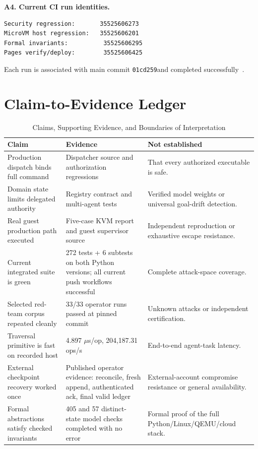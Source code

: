 \documentclass[journal]{IEEEtran}
\newcommand{\mainshort}{\texttt{01cd259}}
\begin{document}
\textbf{A4. Current CI run identities.}
\begin{verbatim}
Security regression:       35525606273
MicroVM host regression:   35525606201
Formal invariants:          35525606295
Pages verify/deploy:        35525606425
\end{verbatim}
Each run is associated with main commit \mainshort and completed successfully~\cite{BULL_CI_Security,BULL_CI_MicroVM,BULL_CI_Formal,BULL_CI_Pages}.

\section{Claim-to-Evidence Ledger}
\begin{table}[!t]
\caption{Claims, Supporting Evidence, and Boundaries of Interpretation}
\label{tab:ledger}
\centering
\small
\begin{tabularx}{\textwidth}{lYY}
\toprule
\textbf{Claim} & \textbf{Evidence} & \textbf{Not established} \\
\midrule
Production dispatch binds full command & Dispatcher source and authorization regressions~\cite{BULL_Dispatcher,BULL_CI_Security} & That every authorized executable is safe. \\
Domain state limits delegated authority & Registry contract and multi-agent tests~\cite{BULL_SecurityDomain,BULL_MultiAgent} & Verified model weights or universal goal-drift detection. \\
Real guest production path executed & Five-case KVM report and guest supervisor source~\cite{BULL_MicroVMReport,BULL_GuestEngine} & Independent reproduction or exhaustive escape resistance. \\
Current integrated suite is green & 272 tests + 6 subtests on both Python versions; all current push workflows successful~\cite{BULL_CI_Security,BULL_CI_MicroVM,BULL_CI_Formal,BULL_CI_Pages} & Complete attack-space coverage. \\
Selected red-team corpus repeated cleanly & 33/33 operator runs passed at pinned commit~\cite{BULL_Benchmark} & Unknown attacks or independent certification. \\
Traversal primitive is fast on recorded host & 4.897 $\mu$s/op, 204,187.31 ops/s~\cite{BULL_BenchmarkJSON} & End-to-end agent-task latency. \\
External checkpoint recovery worked once & Published operator evidence: reconcile, fresh append, authenticated ack, final valid ledger~\cite{BULL_ExternalAudit} & External-account compromise resistance or general availability. \\
Formal abstractions satisfy checked invariants & 405 and 57 distinct-state model checks completed with no error~\cite{BULL_CI_Formal} & Formal proof of the full Python/Linux/QEMU/cloud stack. \\
\bottomrule
\end{tabularx}
\end{table}
\end{document}
